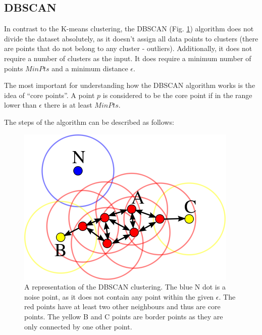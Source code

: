 \subsection{DBSCAN}

In contrast to the K-means clustering, the DBSCAN\cite{Ester96adensity-based} (Fig. \ref{fig:dbscan}) algorithm does not divide the dataset absolutely, as it doesn't assign all data points to clusters (there are points that do not belong to any cluster - outliers). Additionally, it does not require a number of clusters as the input.
It does require a minimum number of points $MinPts$ and a minimum distance $\epsilon$.

The most important for understanding how the DBSCAN algorithm works is the idea of  ``core points''.
A point $p$ is considered to be the core point if in the range lower than $\epsilon$ there is at least $MinPts$.

The steps of the algorithm can be described as follows:

\begin{figure}
  \centering
  \includegraphics[width=0.45\linewidth]{figures/chapter3/400px-DBSCAN-Illustration.svg.png}
  \caption[dbscan]{A representation of the DBSCAN clustering. The blue N dot is a noise point, as it does not contain any point within the given $\epsilon$. The red points have at least two other neighbours and thus are core points. The yellow B and C points are border points as they are only connected by one other point.\footnotemark }
  \label{fig:dbscan}
\end{figure}




